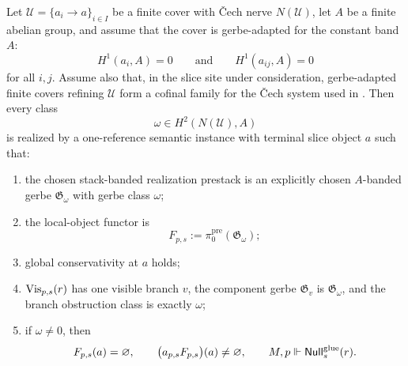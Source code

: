 \begin{proposition}\label{prop:semantic-gerbe-realization}
Let $\mathcal U=\{a_i\to a\}_{i\in I}$ be a finite cover with \v{C}ech nerve $N(\mathcal U)$, let $A$ be a finite abelian group, and assume that the cover is gerbe-adapted for the constant band $A$:
\[
H^1(a_i,A)=0
\qquad\text{and}\qquad
H^1(a_{ij},A)=0
\]
for all $i,j$. Assume also that, in the slice site under consideration,
gerbe-adapted finite covers refining $\mathcal U$ form a cofinal family for the
\v{C}ech system used in . Then every class
\[
\omega\in H^2(N(\mathcal U),A)
\]
is realized by a one-reference semantic instance with terminal slice object $a$
such that:
\begin{enumerate}[label=(\roman*),nosep]
\item the chosen stack-banded realization prestack is an explicitly chosen $A$-banded gerbe
$\mathfrak G_\omega$ with gerbe class $\omega$;
\item the local-object functor is
\[
F_{p,s}:=\pi_0^{\mathrm{pre}}(\mathfrak G_\omega);
\]
\item global conservativity at $a$ holds;
\item $\mathrm{Vis}_{p,s}(r)$ has one visible branch $v$, the component gerbe
$\mathfrak G_v$ is $\mathfrak G_\omega$, and the branch obstruction class is
exactly $\omega$;
\item if $\omega\neq 0$, then
\[
F_{p,s}(a)=\varnothing,
\qquad
\bigl(a_{p,s}F_{p,s}\bigr)(a)\neq\varnothing,
\qquad
M,p\Vdash \mathsf{Null}^{\mathrm{glue}}_s(r).
\]
\end{enumerate}
\end{proposition}

